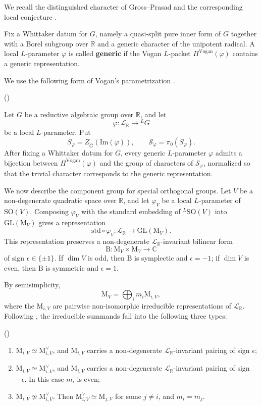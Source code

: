 \documentclass[12pt]{amsart}
\numberwithin{equation}{subsection}
\newcounter{keepeqno}
\newenvironment{num}
 {\setcounter{keepeqno}{\value{equation}}%
  \begin{list}{(\theequation)}{\usecounter{equation}}%
  \setcounter{equation}{\value{keepeqno}}}
 {\end{list}}
\newcommand{\BC}{{\mathbb {C}}}
\newcommand{\BR}{{\mathbb {R}}}
\newcommand{\CL}{{\mathcal {L}}}
\newcommand{\CS}{{\mathcal {S}}}
\newcommand{\RB}{{\mathrm {B}}}
\newcommand{\RM}{{\mathrm {M}}}
\newcommand{\RO}{{\mathrm {O}}}
\newcommand{\GL}{{\mathrm{GL}}}
\renewcommand{\Im}{{\mathrm{Im}}}
\newcommand{\SO}{{\mathrm{SO}}}
\newcommand{\Sp}{{\mathrm{Sp}}}
\newcommand{\wh}{\widehat}
\def\eps{{\epsilon}}
\def\LG{{}^{L}G}
\def\vphi{\varphi}
\def\Vg{\mathrm{Vogan}}
\def\SO{\mathrm{SO}}
\begin{document}
We recall the distinguished character of Gross--Prasad
\cite[\S 10]{MR1186476} and the corresponding local conjecture
\cite{MR1186476,MR1295124}.

Fix a Whittaker datum for $G$, namely a quasi-split pure inner form of $G$
together with a Borel subgroup over $\BR$ and a generic character of the
unipotent radical. A local $L$-parameter $\vphi$ is called \textbf{generic} if
the Vogan $L$-packet $\Pi^{\Vg}(\vphi)$ contains a generic representation.

We use the following form of Vogan's parametrization \cite[Thm.~6.3]{MR1216197}.

\begin{num}
\item\label{num:shelstadvogandual}
Let $G$ be a reductive algebraic group over $\BR$, and let
\[
\vphi:\CL_\BR\to \LG
\]
be a local $L$-parameter. Put
\[
S_\vphi=Z_{\wh{G}}(\Im(\vphi)),\qquad
\CS_\vphi=\pi_0(S_\vphi).
\]
After fixing a Whittaker datum for $G$, every generic $L$-parameter $\vphi$
admits a bijection between $\Pi^{\Vg}(\vphi)$ and the group of characters of
$\CS_\vphi$, normalized so that the trivial character corresponds to the
generic representation.
\end{num}

We now describe the component group for special orthogonal groups. Let $V$ be a
non-degenerate quadratic space over $\BR$, and let $\vphi_V$ be a local
$L$-parameter of $\SO(V)$. Composing $\vphi_V$ with the standard embedding of
${}^L\SO(V)$ into $\GL(\RM_V)$ gives a representation
\[
\mathrm{std}\circ \vphi_V:\CL_\BR\to \GL(\RM_V).
\]
This representation preserves a non-degenerate $\CL_\BR$-invariant bilinear
form
\[
\RB:\RM_V\times \RM_V\to \BC
\]
of sign $\eps\in\{\pm 1\}$. If $\dim V$ is odd, then $\RB$ is symplectic and
$\eps=-1$; if $\dim V$ is even, then $\RB$ is symmetric and $\eps=1$.

By semisimplicity,
\[
\RM_V=\bigoplus_i m_i\RM_{i,V},
\]
where the $\RM_{i,V}$ are pairwise non-isomorphic irreducible representations
of $\CL_\BR$. Following \cite[Prop.~6.5, Prop.~7.6]{MR1186476}, the irreducible
summands fall into the following three types:
\begin{num}
\item[]
\begin{enumerate}
\item[($\RO$-type)]
$\RM_{i,V}\simeq \RM_{i,V}^\vee$, and $\RM_{i,V}$ carries a non-degenerate
$\CL_\BR$-invariant pairing of sign $\eps$;

\item[($\Sp$-type)]
$\RM_{i,V}\simeq \RM_{i,V}^\vee$, and $\RM_{i,V}$ carries a non-degenerate
$\CL_\BR$-invariant pairing of sign $-\eps$. In this case $m_i$ is even;

\item[($\GL$-type)]
$\RM_{i,V}\not\simeq \RM_{i,V}^\vee$. Then
$\RM_{i,V}^\vee\simeq \RM_{j,V}$ for some $j\neq i$, and $m_i=m_j$.
\end{enumerate}
\end{num}
\end{document}
